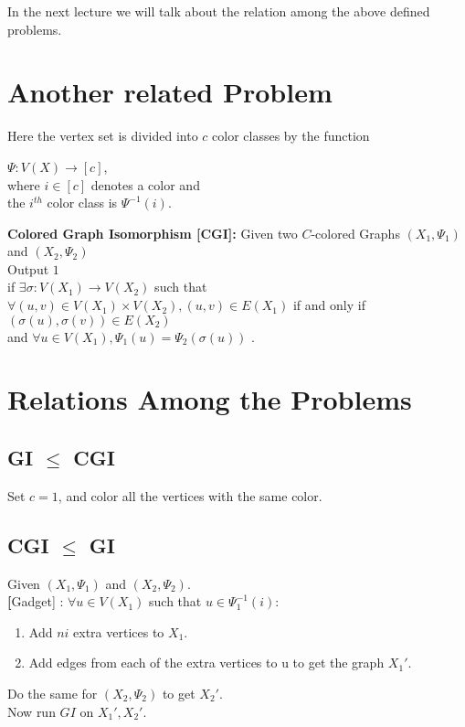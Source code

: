 In the next lecture we will talk about the relation among the above defined problems.




\section{Another related Problem}
Here the vertex set is divided into $c$ color classes by the function 
\begin{center} $\Psi : V(X) \rightarrow [c]$,\\
 where $i \in [c]$ denotes a color and\\
 the $i^{th}$ color class is $\Psi^{-1}(i)$.
\end{center}

\textbf{Colored Graph Isomorphism [CGI]:} Given two $C$-colored Graphs $(X_1,\Psi_1)$ and $(X_2,\Psi_2)$\\
Output $1$ \\
if $\exists \sigma : V(X_1) \rightarrow V(X_2)$ such that 
$\forall (u,v) \in V(X_1)\times V(X_2), (u,v) \in E(X_1)$ if and only if $(\sigma(u), \sigma(v)) \in E(X_2) $\\
 and $\forall u \in V(X_1) , \Psi_1(u) = \Psi_2(\sigma(u))$ .

\section{Relations Among the Problems}

\subsection{GI $\le$ CGI}
	Set $c=1$, and color all the vertices with the same color.

\subsection{CGI $\le$ GI}
Given $(X_1,\Psi_1)$ and $(X_2,\Psi_2)$.\\
\textbf[Gadget] : $\forall u \in V(X_1)$ such that $u \in \Psi_1^{-1}(i)$:
\begin{enumerate}
\item Add $ni$ extra vertices to $X_1$.
\item Add edges from each of the extra vertices to u to get the graph $X_1'$.
\end{enumerate}
Do the same for $(X_2,\Psi_2)$ to get $X_2'$.\\
Now run $GI$ on $X_1',X_2'$.

